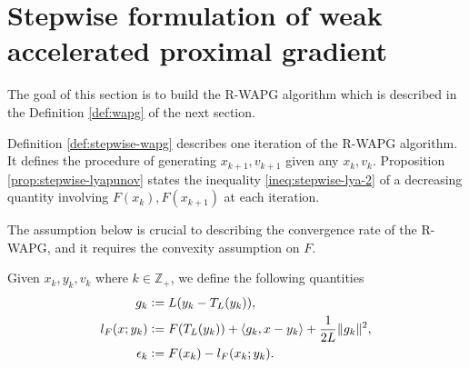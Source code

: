 \documentclass[12pt]{article}
\begin{document}
\section{Stepwise formulation of weak accelerated proximal gradient}\label{sec:stepwise-stuff}
    The goal of this section is to build the R-WAPG algorithm which is described in the Definition \ref{def:wapg} of the next section.
    \par
    Definition \ref{def:stepwise-wapg} describes one iteration of the R-WAPG algorithm.
    It defines the procedure of generating $x_{k + 1}, v_{k + 1}$ given any $x_k, v_k$.
    Proposition \ref{prop:stepwise-lyapunov} states the inequality \eqref{ineq:stepwise-lya-2}  of a decreasing quantity involving $F(x_k), F(x_{k + 1})$ at each iteration.
    \par
    The assumption below is crucial to describing the convergence rate of the R-WAPG, and it requires the convexity assumption on $F$.
    \begin{assumption}\label{ass:regret-gap}
        Given $x_k, y_k, v_k$ where $k \in \mathbb Z_+$, we define the following quantities
        \begin{align}
            g_k &\vcentcolon= L(y_k - T_L(y_k)),
            \label{eqn:grad-map}
            \\
            l_F(x; y_k) &\vcentcolon= F(T_L(y_k)) + \langle g_k, x - y_k\rangle + \frac{1}{2L}\Vert g_k\Vert^2,
            \label{eqn:lower-linearization}
            \\
            \epsilon_{k} &\vcentcolon= F(x_k) - l_F(x_k; y_k).
            \label{eqn:regret}
        \end{align}
    \end{assumption}
\end{document}
